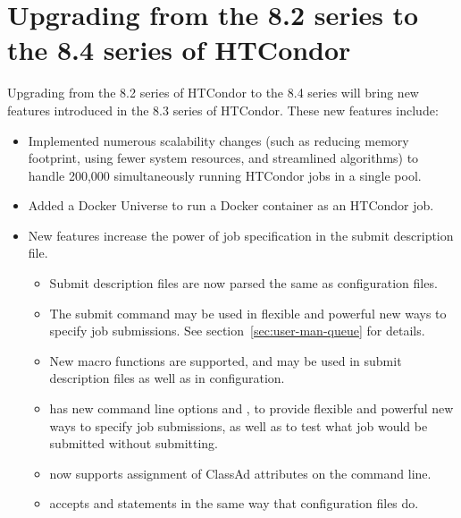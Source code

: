 \section{Upgrading from the 8.2 series to the 8.4 series of HTCondor}\label{sec:to-8.4}

Upgrading from the 8.2 series of HTCondor to the 8.4 series
will bring new features introduced in the 8.3 series of HTCondor.
These new features include:
\begin{itemize}

\item Implemented numerous scalability changes (such as reducing memory
footprint, using fewer system resources, and streamlined algorithms) to
handle 200,000 simultaneously running HTCondor jobs in a single pool.

\item Added a Docker Universe to run a Docker container as an HTCondor job.

\item New features increase the power of job specification
in the submit description file.

  \begin{itemize}
  \item Submit description files are now parsed the same as configuration files.

  \item The  submit command may be used in
flexible and powerful new ways to specify job submissions.
See section~\ref{sec:user-man-queue} for details.

  \item New macro functions are supported,
and may be used in submit description files as well as in configuration.

  \item {} has new command line options 
and ,
to provide flexible and powerful new ways to specify job submissions,
as well as to test what job would be submitted without submitting.

  \item {} now supports assignment of ClassAd attributes
on the command line.

  \item {} accepts  and 
statements in the same way that configuration files do.


\end{itemize}
\end{itemize}
